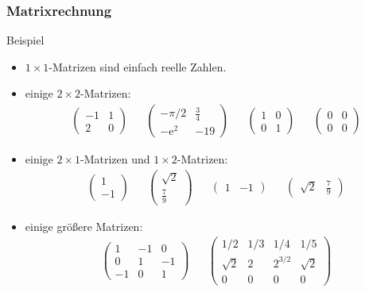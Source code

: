 \documentclass{beamer}
\renewcommand{\oe}{\"o}
\newcommand{\mytitle}{Matrixrechnung}
\begin{document}
\begin{frame}\frametitle{\mytitle}
	\begin{block}{Beispiel}
		\begin{itemize}
			\item $1\times 1$-Matrizen sind einfach reelle Zahlen.
			\item einige $2\times 2$-Matrizen: 
				\begin{align*}
					\begin{pmatrix} -1&1\\2&0 \end{pmatrix}&&
					\begin{pmatrix} -\pi/2&\frac{3}{4}\\-\mathrm e^2&-19 \end{pmatrix}&&
					\begin{pmatrix} 1&0\\0&1\end{pmatrix}&&
					\begin{pmatrix} 0&0\\0&0\end{pmatrix}
				\end{align*}
			\item einige $2\times 1$-Matrizen und $1\times 2$-Matrizen:
				\begin{align*}
					\begin{pmatrix}1\\-1\end{pmatrix}&&
					\begin{pmatrix}\sqrt 2\\\frac{7}{9}\end{pmatrix}&&
					\begin{pmatrix}1&-1\end{pmatrix}&&
					\begin{pmatrix}\sqrt 2&\frac{7}{9}\end{pmatrix}
				\end{align*}
			\item einige gr\oe\ss ere Matrizen:
				\begin{align*}
					\begin{pmatrix}1&-1&0\\0&1&-1\\-1&0&1\end{pmatrix}&&
					\begin{pmatrix}1/2&1/3&1/4&1/5\\\sqrt 2&2&2^{3/2}&\sqrt 2\\0&0&0&0\end{pmatrix}
				\end{align*}
		\end{itemize}
	\end{block}
\end{frame}
\end{document}
